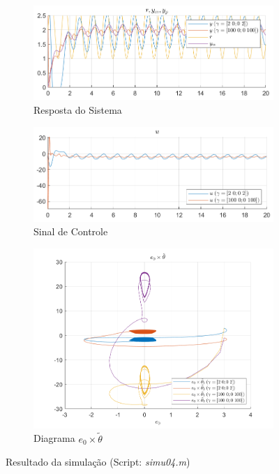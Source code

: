 \documentclass[10pt]{article}
\begin{document}
\begin{figure}[h!]
    \begin{subfigure}[b]{0.45\textwidth}
        \centering
        \includegraphics[width=\textwidth]{img/fig04c.png}
        \caption{Resposta do Sistema}
    \end{subfigure}
    \begin{subfigure}[b]{0.45\textwidth}
        \centering
        \includegraphics[width=\textwidth]{img/fig04e.png}
        \caption{Sinal de Controle}
    \end{subfigure}

    \vspace{0.5cm}

    \begin{subfigure}[b]{0.4\textwidth}
        \centering
        \includegraphics[width=\textwidth]{img/fig04d.png}
        \caption{Diagrama $e_0 \times \tilde{\theta}$}
    \end{subfigure}

    \caption{Resultado da simulação (Script: \textit{simu04.m})}
    \label{fig:sim4}
\end{figure}
\end{document}
